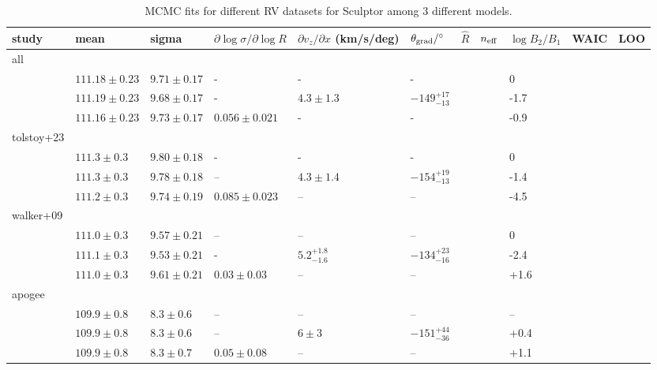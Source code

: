 \begin{table*}[t]
\centering
\caption[Sculptor RV fits]{\label{tbl:scl_rv_mcmc}MCMC fits for different RV datasets for Sculptor among 3 different models. }
\label{tbl:scl_rv_mcmc}
\begin{tabular}{lllllllllll}
\toprule
study & mean & sigma & $\partial \log\sigma / \partial \log R$ & $\partial v_z / \partial x$ (km/s/deg) & $\theta_{\rm grad} / ^{\circ}$ & $\hat R$ & $n_{\rm eff}$ & $\log B_2/B_1$ & WAIC & LOO\\
\midrule
all &  &  &  &  &  &  &  &  &  & \\
 & $111.18\pm0.23$ & $9.71\pm0.17$ & - & - & - &  &  & 0 &  & \\
 & $111.19 \pm 0.23$ & $9.68\pm0.17$ & - & $4.3\pm1.3$ & $-149_{-13}^{+17}$ &  &  & -1.7 &  & \\
 & $111.16\pm0.23$ & $9.73\pm0.17$ & $0.056\pm0.021$ & - & - &  &  & -0.9 &  & \\
tolstoy+23 &  &  &  &  &  &  &  &  &  & \\
 & $111.3 \pm 0.3$ & $9.80 \pm 0.18$ & - & - & - &  &  & 0 &  & \\
 & $111.3\pm0.3$ & $9.78\pm0.18$ & – & $4.3\pm1.4$ & $-154_{-13}^{+19}$ &  &  & -1.4 &  & \\
 & $111.2 \pm 0.3$ & $9.74\pm0.19$ & $0.085 \pm 0.023$ & – & – &  &  & -4.5 &  & \\
walker+09 &  &  &  &  &  &  &  &  &  & \\
 & $111.0\pm0.3$ & $9.57\pm0.21$ & – & – & – &  &  & 0 &  & \\
 & $111.1\pm0.3$ & $9.53\pm0.21$ & - & $5.2_{-1.6}^{+1.8}$ & $-134_{-16}^{+23}$ &  &  & -2.4 &  & \\
 & $111.0\pm0.3$ & $9.61\pm0.21$ & $0.03\pm0.03$ & – & – &  &  & +1.6 &  & \\
apogee &  &  &  &  &  &  &  &  &  & \\
 & $109.9\pm0.8$ & $8.3\pm0.6$ & – & – & – &  &  & – &  & \\
 & $109.9\pm0.8$ & $8.3\pm0.6$ & – & $6\pm3$ & $-151_{-36}^{+44}$ &  &  & +0.4 &  & \\
 & $109.9\pm0.8$ & $8.3\pm0.7$ & $0.05\pm0.08$ & – & – &  &  & +1.1 &  & \\
\bottomrule
\end{tabular}
\end{table*}


